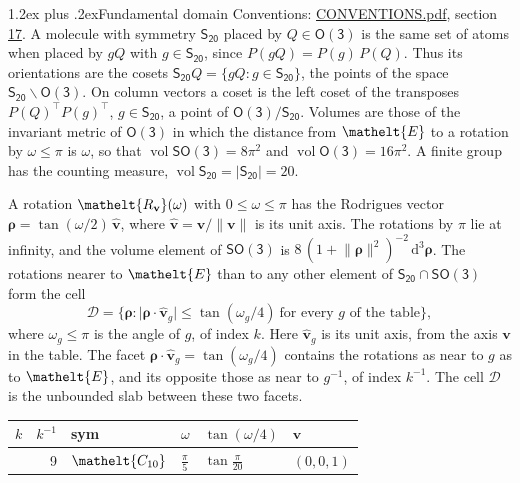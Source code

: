 \documentclass[10pt,a4paper]{article}
\makeatletter
\renewcommand\section{\@startsection{section}{1}{\z@}{-3ex plus -1ex minus -.2ex}%
  {1.2ex plus .2ex}{\normalfont\large\sffamily\bfseries\color{parttitle}}}
\numberwithin{equation}{section}
\newcommand{\eltfont}[1]{{\let\sigma\eltsigma\mathelt{#1}}}
\newcommand{\grp}[1]{\mathsf{#1}}
\newcommand{\cls}[1]{\eltfont{#1}}
\newcommand{\elt}[1]{\eltfont{#1}}
\newcommand{\dirvec}[3]{(#1, #2, #3)}
\newcommand{\unitaxis}{\hat{\mathbf{v}}}
\newcommand{\vv}{\mathbf{v}}
\newcommand{\diff}{\mathrm{d}}
\newcommand{\vol}{\operatorname{vol}}
\newcommand{\rodrigues}{\boldsymbol{\rho}}
\newcommand{\fcell}{\mathcal{D}}
\makeatother
\begin{document}
\section{Fundamental domain}\label{s:fundamental_domain}
Conventions: \href{../../CONVENTIONS.pdf}{CONVENTIONS.pdf}, section \href{../../CONVENTIONS.pdf\#conv.17}{17}.
\leavevmode\label{n:element.placement}A molecule with symmetry $\grp{S_{20}}$ placed by $Q \in \grp{O(3)}$ is the same set of atoms when placed by $gQ$ with $g \in \grp{S_{20}}$, since $P(gQ) = P(g)\,P(Q)$. \label{n:operator.cosets}Thus its orientations are the cosets $\grp{S_{20}}Q = \{gQ : g \in \grp{S_{20}}\}$, the points of the space $\grp{S_{20}}\backslash\grp{O(3)}$. On column vectors a coset is the left coset of the transposes $P(Q)^{\top}P(g)^{\top}$, $g \in \grp{S_{20}}$, a point of $\grp{O(3)}/\grp{S_{20}}$.
\leavevmode\label{n:operator.volume}Volumes are those of the invariant metric of \href{O3.pdf}{$\grp{O(3)}$} in which the distance from $\elt{E}$ to a rotation by $\omega \le \pi$ is $\omega$, so that $\vol\grp{SO(3)} = 8\pi^2$ and $\vol\grp{O(3)} = 16\pi^2$. A finite group has the counting measure, $\vol\grp{S_{20}} = |\grp{S_{20}}| = 20$.

\leavevmode\label{n:vector.rodrigues}\label{n:vector.unitaxis}A rotation $\elt{R_{\vv}}(\omega)$ with $0 \le \omega \le \pi$ has the Rodrigues vector $\rodrigues = \tan(\omega/2)\,\unitaxis$, where $\unitaxis = \vv/\lVert\vv\rVert$ is its unit axis. The rotations by $\pi$ lie at infinity, and the volume element of \href{SO3.pdf}{$\grp{SO(3)}$} is $8\,(1 + \lVert\rodrigues\rVert^2)^{-2}\,\diff^3\rodrigues$.
\leavevmode\label{n:set.cell}The rotations nearer to $\elt{E}$ than to any other element of $\grp{S_{20}} \cap \grp{SO(3)}$ form the cell
\begin{equation}\label{e:cell}\fcell = \bigl\{\rodrigues : \lvert\rodrigues\cdot\unitaxis_g\rvert \le \tan(\omega_g/4)\ \text{for every $g$ of the table}\bigr\},\end{equation}
where $\omega_g \le \pi$ is the angle of $g$, of index $k$. Here $\unitaxis_g$ is its unit axis, from the axis $\vv$ in the table. The facet $\rodrigues\cdot\unitaxis_g = \tan(\omega_g/4)$ contains the rotations as near to $g$ as to $\elt{E}$, and its opposite those as near to $g^{-1}$, of index $k^{-1}$. The cell $\fcell$ is the unbounded slab between these two facets.
{\small{\renewcommand{\arraystretch}{1.3}\begin{longtable}{@{}rrllll@{}}\toprule
$k$ & $k^{-1}$ & sym & $\omega$ & $\tan(\omega/4)$ & $\vv$\\\midrule\endhead
\bottomrule\endfoot\endlastfoot
1 & 9 & $\cls{C_{10}}$ & $\tfrac{\pi}{5}$ & $\tan\tfrac{\pi}{20}$ & $\dirvec{0}{0}{1}$\\
\bottomrule\end{longtable}}}
\end{document}
